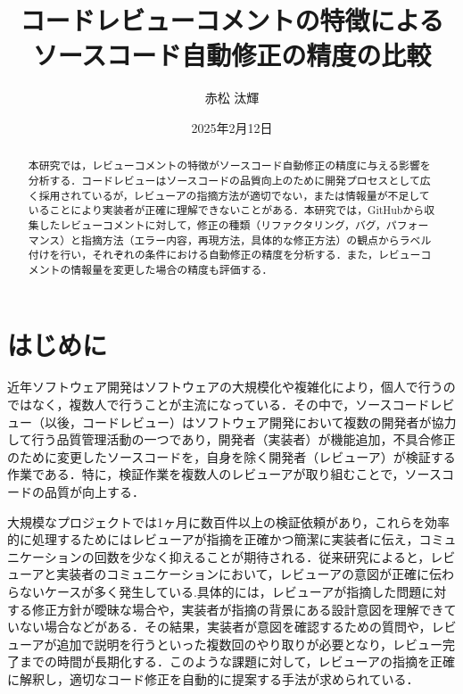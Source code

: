 \documentclass[11pt]{jreport}
\title{コードレビューコメントの特徴による\\ソースコード自動修正の精度の比較}
\author{赤松 汰輝}
\date{2025年2月12日}	%
\begin{document}
\maketitle

\begin{abstract}
本研究では，レビューコメントの特徴がソースコード自動修正の精度に与える影響を分析する．コードレビューはソースコードの品質向上のために開発プロセスとして広く採用されているが，レビューアの指摘方法が適切でない，または情報量が不足していることにより実装者が正確に理解できないことがある．本研究では，GitHubから収集したレビューコメントに対して，修正の種類（リファクタリング，バグ，パフォーマンス）と指摘方法（エラー内容，再現方法，具体的な修正方法）の観点からラベル付けを行い，それぞれの条件における自動修正の精度を分析する．また，レビューコメントの情報量を変更した場合の精度も評価する．
\end{abstract}

\tableofcontents



\newpage
{}	%



\chapter{はじめに}
近年ソフトウェア開発はソフトウェアの大規模化や複雑化により，個人で行うのではなく，複数人で行うことが主流になっている．その中で，ソースコードレビュー（以後，コードレビュー）はソフトウェア開発において複数の開発者が協力して行う品質管理活動の一つであり，開発者（実装者）が機能追加，不具合修正のために変更したソースコードを，自身を除く開発者（レビューア）が検証する作業である．特に，検証作業を複数人のレビューアが取り組むことで，ソースコードの品質が向上する\cite{mcintosh2014impact}．

大規模なプロジェクトでは1ヶ月に数百件以上の検証依頼があり\cite{rigby2013convergent}，これらを効率的に処理するためにはレビューアが指摘を正確かつ簡潔に実装者に伝え，コミュニケーションの回数を少なく抑えることが期待される．従来研究によると，レビューアと実装者のコミュニケーションにおいて，レビューアの意図が正確に伝わらないケースが多く発生している\cite{bacchelli2013expectations}.具体的には，レビューアが指摘した問題に対する修正方針が曖昧な場合や，実装者が指摘の背景にある設計意図を理解できていない場合などがある．その結果，実装者が意図を確認するための質問や，レビューアが追加で説明を行うといった複数回のやり取りが必要となり，レビュー完了までの時間が長期化する．このような課題に対して，レビューアの指摘を正確に解釈し，適切なコード修正を自動的に提案する手法が求められている．
\end{document}

